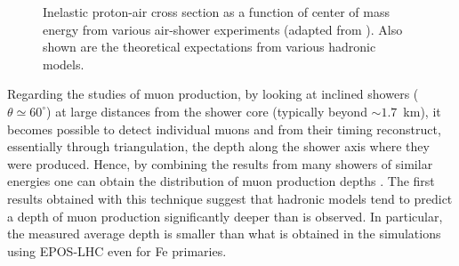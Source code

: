 \documentclass[twoside,12pt]{article}
\begin{document}
\begin{figure}[tb]
\begin{center}
\begin{minipage}[t]{8 cm}
\centerline{}
\end{minipage}
\caption{Inelastic proton-air cross section as a function of center of mass energy from various air-shower experiments (adapted from \cite{ppxsecta}). Also shown are the theoretical expectations from various hadronic models. \label{ppxsect.fig}}
\end{center}
\end{figure}


Regarding the studies of muon production, by looking at inclined showers ($\theta\simeq 60^\circ$) at large distances from the shower core (typically beyond $\sim 1.7$~km), it becomes possible to detect individual muons and from their timing reconstruct, essentially through triangulation, the depth along the shower axis where they were produced. Hence, by combining the results from many showers of similar energies one can obtain the distribution of muon production depths \cite{xmumaxa}. The first results obtained with this technique suggest that hadronic models tend to predict a depth of muon production significantly deeper than  is observed. In particular, the measured average depth is smaller than what is obtained in the simulations using EPOS-LHC even for Fe primaries. 
\end{document}
